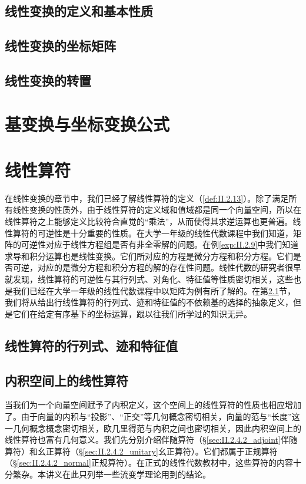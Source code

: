 \documentclass[
  zihao=5,
  a4paper,
  heading=true,
  twoside
]{ctexbook}
\theoremstyle{definition}
\theoremstyle{plain}
\begin{document}
\subsection{线性变换的定义和基本性质}\label{sec:II.2.2.1}


\subsection{线性变换的坐标矩阵}\label{sec:II.2.2.2}


\subsection{线性变换的转置}\label{sec:II.2.2.3}


\section{基变换与坐标变换公式}\label{sec:II.2.3}


\section{线性算符}\label{sec:II.2.4}
在线性变换的章节中，我们已经了解线性算符的定义（\ref{def:II.2.13}）。除了满足所有线性变换的性质外，由于线性算符的定义域和值域都是同一个向量空间，所以在线性算符之上能够定义比较符合直觉的“乘法”，从而使得其求逆运算也更普遍。线性算符的可逆性是十分重要的性质。在大学一年级的线性代数课程中我们知道，矩阵的可逆性对应于线性方程组是否有非全零解的问题。在例\ref{exp:II.2.9}中我们知道求导和积分运算也是线性变换。它们所对应的方程是微分方程和积分方程。它们是否可逆，对应的是微分方程和积分方程的解的存在性问题。线性代数的研究者很早就发现，线性算符的可逆性与其行列式、对角化、特征值等性质密切相关，这些也是我们已经在大学一年级的线性代数课程中以矩阵为例有所了解的。在第\ref{sec:II.2.4.1}节，我们将从给出行线性算符的行列式、迹和特征值的不依赖基的选择的抽象定义，但是它们在给定有序基下的坐标运算，跟以往我们所学过的知识无异。

\subsection{线性算符的行列式、迹和特征值}\label{sec:II.2.4.1}


\subsection{内积空间上的线性算符}\label{sec:II.2.4.2}
当我们为一个向量空间赋予了内积定义，这个空间上的线性算符的性质也相应增加了。由于向量的内积与“投影”、“正交”等几何概念密切相关，向量的范与“长度”这一几何概念概念密切相关，欧几里得范与内积之间也密切相关，因此内积空间上的线性算符也富有几何意义。我们先分别介绍伴随算符（\S \ref{sec:II.2.4.2_adjoint}伴随算符）和幺正算符（\S \ref{sec:II.2.4.2_unitary}幺正算符）。它们都属于正规算符（\S \ref{sec:II.2.4.2_normal}正规算符）。在正式的线性代数教材中，这些算符的内容十分繁杂。本讲义在此只列举一些流变学理论用到的结论。
\end{document}
